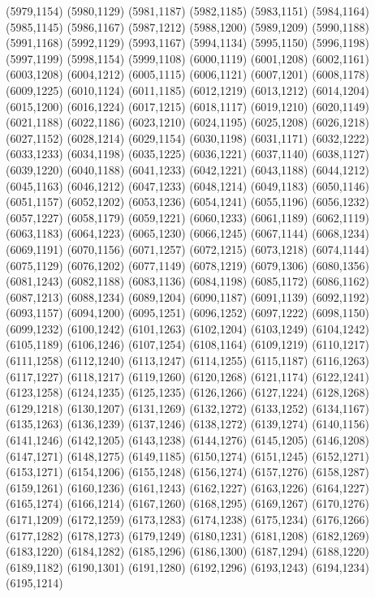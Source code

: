 (5979,1154)
(5980,1129)
(5981,1187)
(5982,1185)
(5983,1151)
(5984,1164)
(5985,1145)
(5986,1167)
(5987,1212)
(5988,1200)
(5989,1209)
(5990,1188)
(5991,1168)
(5992,1129)
(5993,1167)
(5994,1134)
(5995,1150)
(5996,1198)
(5997,1199)
(5998,1154)
(5999,1108)
(6000,1119)
(6001,1208)
(6002,1161)
(6003,1208)
(6004,1212)
(6005,1115)
(6006,1121)
(6007,1201)
(6008,1178)
(6009,1225)
(6010,1124)
(6011,1185)
(6012,1219)
(6013,1212)
(6014,1204)
(6015,1200)
(6016,1224)
(6017,1215)
(6018,1117)
(6019,1210)
(6020,1149)
(6021,1188)
(6022,1186)
(6023,1210)
(6024,1195)
(6025,1208)
(6026,1218)
(6027,1152)
(6028,1214)
(6029,1154)
(6030,1198)
(6031,1171)
(6032,1222)
(6033,1233)
(6034,1198)
(6035,1225)
(6036,1221)
(6037,1140)
(6038,1127)
(6039,1220)
(6040,1188)
(6041,1233)
(6042,1221)
(6043,1188)
(6044,1212)
(6045,1163)
(6046,1212)
(6047,1233)
(6048,1214)
(6049,1183)
(6050,1146)
(6051,1157)
(6052,1202)
(6053,1236)
(6054,1241)
(6055,1196)
(6056,1232)
(6057,1227)
(6058,1179)
(6059,1221)
(6060,1233)
(6061,1189)
(6062,1119)
(6063,1183)
(6064,1223)
(6065,1230)
(6066,1245)
(6067,1144)
(6068,1234)
(6069,1191)
(6070,1156)
(6071,1257)
(6072,1215)
(6073,1218)
(6074,1144)
(6075,1129)
(6076,1202)
(6077,1149)
(6078,1219)
(6079,1306)
(6080,1356)
(6081,1243)
(6082,1188)
(6083,1136)
(6084,1198)
(6085,1172)
(6086,1162)
(6087,1213)
(6088,1234)
(6089,1204)
(6090,1187)
(6091,1139)
(6092,1192)
(6093,1157)
(6094,1200)
(6095,1251)
(6096,1252)
(6097,1222)
(6098,1150)
(6099,1232)
(6100,1242)
(6101,1263)
(6102,1204)
(6103,1249)
(6104,1242)
(6105,1189)
(6106,1246)
(6107,1254)
(6108,1164)
(6109,1219)
(6110,1217)
(6111,1258)
(6112,1240)
(6113,1247)
(6114,1255)
(6115,1187)
(6116,1263)
(6117,1227)
(6118,1217)
(6119,1260)
(6120,1268)
(6121,1174)
(6122,1241)
(6123,1258)
(6124,1235)
(6125,1235)
(6126,1266)
(6127,1224)
(6128,1268)
(6129,1218)
(6130,1207)
(6131,1269)
(6132,1272)
(6133,1252)
(6134,1167)
(6135,1263)
(6136,1239)
(6137,1246)
(6138,1272)
(6139,1274)
(6140,1156)
(6141,1246)
(6142,1205)
(6143,1238)
(6144,1276)
(6145,1205)
(6146,1208)
(6147,1271)
(6148,1275)
(6149,1185)
(6150,1274)
(6151,1245)
(6152,1271)
(6153,1271)
(6154,1206)
(6155,1248)
(6156,1274)
(6157,1276)
(6158,1287)
(6159,1261)
(6160,1236)
(6161,1243)
(6162,1227)
(6163,1226)
(6164,1227)
(6165,1274)
(6166,1214)
(6167,1260)
(6168,1295)
(6169,1267)
(6170,1276)
(6171,1209)
(6172,1259)
(6173,1283)
(6174,1238)
(6175,1234)
(6176,1266)
(6177,1282)
(6178,1273)
(6179,1249)
(6180,1231)
(6181,1208)
(6182,1269)
(6183,1220)
(6184,1282)
(6185,1296)
(6186,1300)
(6187,1294)
(6188,1220)
(6189,1182)
(6190,1301)
(6191,1280)
(6192,1296)
(6193,1243)
(6194,1234)
(6195,1214)
